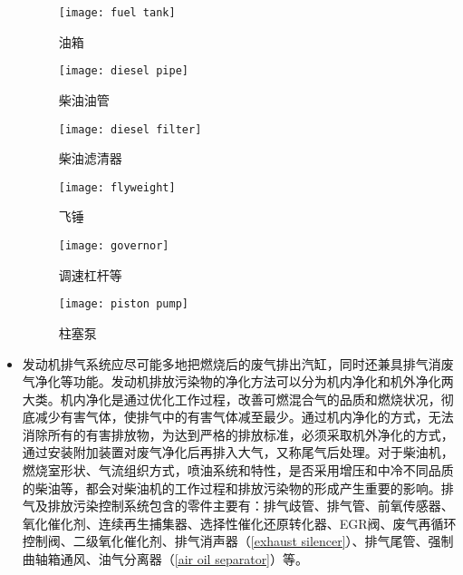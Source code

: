 \documentclass[UTF8]{ctexart}
\numberwithin{figure}{section}
\numberwithin{table}{section}
\begin{document}
\begin{itemize}
	      \begin{figure}[htbp]
		      \centering
		      \begin{minipage}[b]{0.34\textwidth}
			      \centering
			      \texttt{[image: fuel tank]}
			      \caption{油箱}
			      \label{fuel tank}
		      \end{minipage}
		      \begin{minipage}[b]{0.35\textwidth}
			      \centering
			      \texttt{[image: diesel pipe]}
			      \caption{柴油油管}
			      \label{diesel pipe}
		      \end{minipage}
		      \begin{minipage}[b]{0.25\textwidth}
			      \centering
			      \texttt{[image: diesel filter]}
			      \caption{柴油滤清器}
			      \label{diesel filter}
		      \end{minipage}
		      \begin{minipage}[b]{0.35\textwidth}
			      \centering
			      \texttt{[image: flyweight]}
			      \caption{飞锤}
			      \label{flyweight}
		      \end{minipage}
		      \begin{minipage}[b]{0.24\textwidth}
			      \centering
			      \texttt{[image: governor]}
			      \caption{调速杠杆等}
			      \label{governor}
		      \end{minipage}
		      \begin{minipage}[b]{0.35\textwidth}
			      \centering
			      \texttt{[image: piston pump]}
			      \caption{柱塞泵}
			      \label{piston pump}
		      \end{minipage}
	      \end{figure}

	\item 发动机排气系统应尽可能多地把燃烧后的废气排出汽缸，同时还兼具排气消废气净化等功能。发动机排放污染物的净化方法可以分为机内净化和机外净化两大类。机内净化是通过优化工作过程，改善可燃混合气的品质和燃烧状况，彻底减少有害气体，使排气中的有害气体减至最少。通过机内净化的方式，无法消除所有的有害排放物，为达到严格的排放标准，必须采取机外净化的方式，通过安装附加装置对废气净化后再排入大气，又称尾气后处理。对于柴油机，燃烧室形状、气流组织方式，喷油系统和特性，是否采用增压和中冷不同品质的柴油等，都会对柴油机的工作过程和排放污染物的形成产生重要的影响。排气及排放污染控制系统包含的零件主要有：排气歧管、排气管、前氧传感器、氧化催化剂、连续再生捕集器、选择性催化还原转化器、EGR阀、废气再循环控制阀、二级氧化催化剂、排气消声器（\cref{exhaust silencer}）、排气尾管、强制曲轴箱通风、油气分离器（\cref{air oil separator}）等。


\end{itemize}
\end{document}
